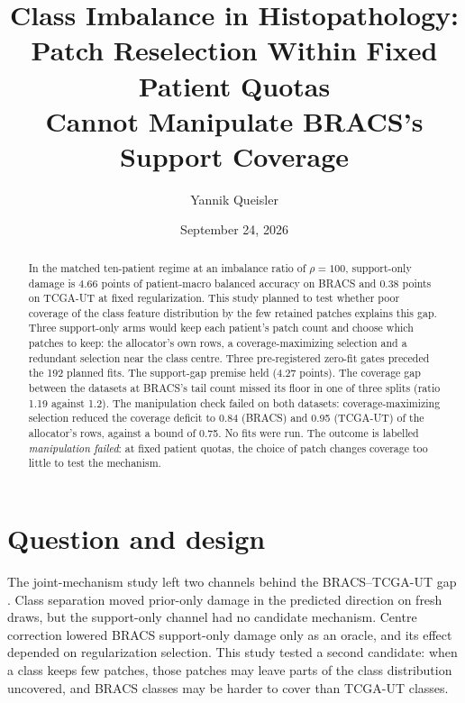 \documentclass[11pt]{article}
\title{Class Imbalance in Histopathology:\\Patch Reselection Within Fixed Patient Quotas\\Cannot Manipulate {BRACS}'s Support Coverage}
\author{Yannik Queisler}
\date{September 24, 2026}
\begin{document}
\raggedbottom
{}
\setlength{\emergencystretch}{2em}
\maketitle
\begin{abstract}
\noindent In the matched ten-patient regime at an imbalance ratio of $\rho=100$, support-only damage is 4.66 points of patient-macro balanced accuracy on BRACS and 0.38 points on TCGA-UT at fixed regularization. This study planned to test whether poor coverage of the class feature distribution by the few retained patches explains this gap. Three support-only arms would keep each patient's patch count and choose which patches to keep: the allocator's own rows, a coverage-maximizing selection and a redundant selection near the class centre. Three pre-registered zero-fit gates preceded the 192 planned fits. The support-gap premise held (4.27 points). The coverage gap between the datasets at BRACS's tail count missed its floor in one of three splits (ratio 1.19 against 1.2). The manipulation check failed on both datasets: coverage-maximizing selection reduced the coverage deficit to 0.84 (BRACS) and 0.95 (TCGA-UT) of the allocator's rows, against a bound of 0.75. No fits were run. The outcome is labelled \emph{manipulation failed}: at fixed patient quotas, the choice of patch changes coverage too little to test the mechanism.
\end{abstract}

\section{Question and design}
\label{sec:design}
The joint-mechanism study left two channels behind the BRACS--TCGA-UT gap \citep{queisler2026jointMechanism}. Class separation moved prior-only damage in the predicted direction on fresh draws, but the support-only channel had no candidate mechanism. Centre correction lowered BRACS support-only damage only as an oracle, and its effect depended on regularization selection. This study tested a second candidate: when a class keeps few patches, those patches may leave parts of the class distribution uncovered, and BRACS classes may be harder to cover than TCGA-UT classes.
\end{document}
